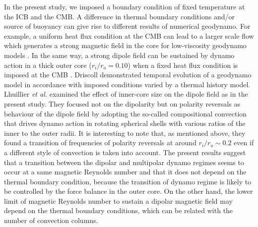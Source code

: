In the present study, we imposed a boundary condition of fixed temperature at the ICB and the CMB.
A difference in thermal boundary conditions and/or source of buoyancy can give rise to different results of numerical geodynamo.
For example, a uniform heat flux condition at the CMB can lead to a larger scale flow which generates a strong magnetic field in the core for low-viscosity geodynamo models \cite{Sakuraba:2009}.
In the same way, a strong dipole field can be sustained by dynamo action in a thick outer core ($r_i / r_o = 0.10$) when a fixed heat flux condition is imposed at the CMB \cite{Hori:2010}.
Driscoll  demonstrated temporal evolution of a geodynamo model in accordance with imposed conditions varied by a thermal history model.
Lhuillier {\it et al.}  examined the effect of inner-core size on the dipole field as in the present study.
They focused not on the dipolarity but on polarity reversals as behaviour of the dipole field by adopting the so-called compositional convection that drives dynamo action in rotating spherical shells with various ratios of the inner to the outer radii.
It is interesting to note that, as mentioned above, they found a transition of frequencies of polarity reversals at around $r_i / r_o \sim 0.2$ even if a different style of convection is taken into account.
The present results suggest that a transition between the dipolar and multipolar dynamo regimes seems to occur at a same magnetic Reynolds number and that it does not depend on the thermal boundary condition, because the transition of dynamo regime is likely to be controlled by the force balance in the outer core.
On the other hand, the lower limit of magnetic Reynolds number to sustain a dipolar magnetic field may depend on the thermal boundary conditions, which can be related with the number of convection columns.
